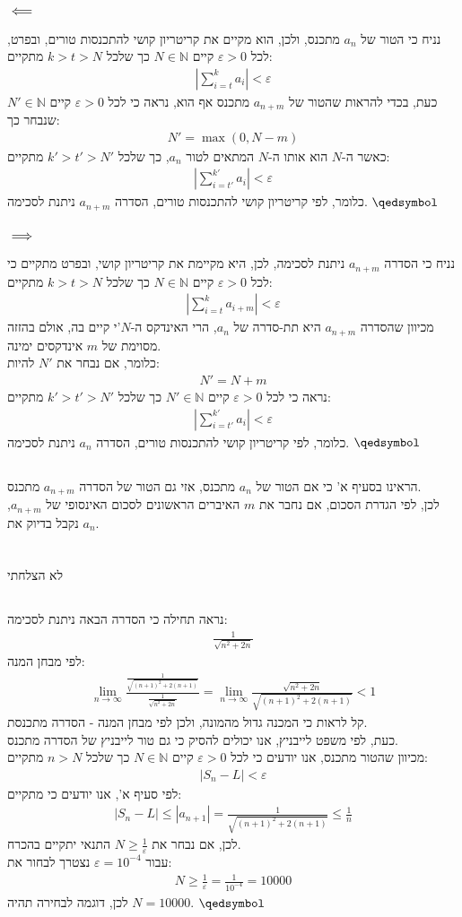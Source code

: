 \documentclass[a4paper, 12pt, leqno]{article}
\newcommand{\sub}[1]{\subsection{\underline{#1}}}
\newcommand{\subsub}[1]{\subsubsection{\underline{#1}}}
\newcommand{\N}{\ensuremath{\mathbb{N}}}
\newcommand{\eq}[1]{\begin{align*}#1\end{align*}}
\newcommand{\limn}{\lim_{n\to\infty}}
\renewcommand{\qed}{\hfill\(\qedsymbol\)}
\renewcommand{\leq}{\leqslant}
\renewcommand{\geq}{\geqslant}
\begin{document}
\section{}
\sub{}
\subsub{$\impliedby$}
נניח כי הטור של $a_n$ מתכנס, ולכן, הוא מקיים את קריטריון קושי להתכנסות טורים, ובפרט, לכל $\varepsilon>0$ קיים $N\in\N$ כך שלכל $k>t>N$ מתקיים:
\eq{
    |\sum_{i=t}^k{a_i}|<\varepsilon
}
כעת, בכדי להראות שהטור של $a_{n+m}$ מתכנס אף הוא, נראה כי לכל $\varepsilon>0$ קיים $N'\in\N$ שנבחר כך:
\eq{
    N'=\max(0,N-m)
}
כאשר ה-$N$ הוא אותו ה-$N$ המתאים לטור $a_n$, כך שלכל $k'>t'>N'$ מתקיים:
\eq{
    |\sum_{i=t'}^{k'}{a_i}|<\varepsilon
}
כלומר, לפי קריטריון קושי להתכנסות טורים, הסדרה $a_{n+m}$ ניתנת לסכימה.
\qed
\subsub{$\implies$}
נניח כי הסדרה $a_{n+m}$ ניתנת לסכימה, לכן, היא מקיימת את קריטריון קושי, ובפרט מתקיים כי לכל $\varepsilon>0$ קיים $N\in\N$ כך שלכל $k>t>N$ מתקיים:
\eq{
    |\sum_{i=t}^{k}{a_{i+m}}|<\varepsilon
}
מכיוון שהסדרה $a_{n+m}$ היא תת-סדרה של $a_n$, הרי האינדקס ה-$N$'י קיים בה, אולם בהזזה מסוימת של $m$ אינדקסים ימינה.\\
כלומר, אם נבחר את $N'$ להיות:
\eq{
    N'=N+m
}
נראה כי לכל $\varepsilon>0$ קיים $N'\in\N$ כך שלכל $k'>t'>N'$ מתקיים:
\eq{
    |\sum_{i=t'}^{k'}{a_{i}}|<\varepsilon
}
כלומר, לפי קריטריון קושי להתכנסות טורים, הסדרה $a_{n}$ ניתנת לסכימה.
\qed
\sub{}
הראינו בסעיף א' כי אם הטור של $a_n$ מתכנס, אזי גם הטור של הסדרה $a_{n+m}$ מתכנס.\\
לכן, לפי הגדרת הסכום, אם נחבר את $m$ האיברים הראשונים לסכום האינסופי של $a_{n+m}$, נקבל בדיוק את $a_n$.
\pagebreak

\section{}
\sub{}
לא הצלחתי
\sub{}
נראה תחילה כי הסדרה הבאה ניתנת לסכימה:
\eq{
    \frac{1}{\sqrt{n^2+2n}}
}
לפי מבחן המנה:
\eq{
    \limn{\frac
    {\frac{1}{\sqrt{(n+1)^2+2(n+1)}}}
    {\frac{1}{\sqrt{n^2+2n}}}}
    =\limn\frac{\sqrt{n^2+2n}}{\sqrt{(n+1)^2+2(n+1)}}<1
}
קל לראות כי המכנה גדול מהמונה, ולכן לפי מבחן המנה - הסדרה מתכנסת.\\
כעת, לפי משפט לייבניץ, אנו יכולים להסיק כי גם טור לייבניץ של הסדרה מתכנס.\\
מכיוון שהטור מתכנס, אנו יודעים כי לכל $\varepsilon>0$ קיים $N\in\N$ כך שלכל $n>N$ מתקיים:
\eq{
    |S_n-L|<\varepsilon
}
לפי סעיף א', אנו יודעים כי מתקיים:
\eq{
    |S_n-L|\leq|a_{n+1}|=\frac{1}{\sqrt{(n+1)^2+2(n+1)}}\leq\frac{1}{n}
}
לכן, אם נבחר את $N\geq\frac{1}{\varepsilon}$ התנאי יתקיים בהכרח.\\
עבור $\varepsilon=10^{-4}$ נצטרך לבחור את:
\eq{
    N\geq\frac{1}{\varepsilon}=\frac{1}{10^{-4}}=10000
}
לכן, דוגמה לבחירה תהיה $N=10000$.
\qed
\end{document}
